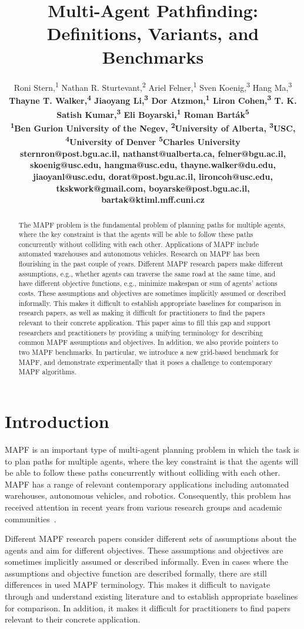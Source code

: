\documentclass[letterpaper]{article} %
\title{Multi-Agent Pathfinding: Definitions, Variants, and Benchmarks}
\author{
Roni Stern,\textsuperscript{\rm 1}
Nathan R. Sturtevant,\textsuperscript{\rm 2}
Ariel Felner,\textsuperscript{\rm 1}
Sven Koenig,\textsuperscript{\rm 3}
Hang Ma,\textsuperscript{\rm 3}\\
\bf \Large Thayne T. Walker,\textsuperscript{\rm 4}
Jiaoyang Li,\textsuperscript{\rm 3}
Dor Atzmon,\textsuperscript{\rm 1}
Liron Cohen,\textsuperscript{\rm 3}
T. K. Satish Kumar,\textsuperscript{\rm 3}
Eli Boyarski,\textsuperscript{\rm 1}
Roman Bart\'{a}k\textsuperscript{\rm 5} \\
\textsuperscript{\rm 1}Ben Gurion University of the Negev,
\textsuperscript{\rm 2}University of Alberta,
\textsuperscript{\rm 3}USC,
\textsuperscript{\rm 4}University of Denver
\textsuperscript{\rm 5}Charles University\\
sternron@post.bgu.ac.il,
nathanst@ualberta.ca,
felner@bgu.ac.il,
skoenig@usc.edu,
hangma@usc.edu,
thayne.walker@du.edu,\\
jiaoyanl@usc.edu,
dorat@post.bgu.ac.il,
lironcoh@usc.edu,
tkskwork@gmail.com,
boyarske@post.bgu.ac.il,
bartak@ktiml.mff.cuni.cz
}
\newcommand{\mapf}{\ac{MAPF}\xspace}
\begin{document}
\maketitle

\begin{abstract}	The \mapf problem is the fundamental problem of planning paths for multiple agents, where the key constraint is that the agents will be able to follow these paths concurrently without colliding with each other. Applications of \mapf include automated warehouses and autonomous vehicles. Research on \mapf has been flourishing in the past couple of years. 
	Different \mapf research papers make different assumptions, e.g., whether agents can traverse the same road at the same time, and have different objective functions, e.g., minimize makespan or sum of agents' actions costs. 
	These assumptions and objectives are sometimes implicitly assumed or described informally. This makes it difficult to establish appropriate baselines for comparison in research papers, as well as making it difficult for practitioners to find the papers relevant to their concrete application. 
	This paper aims to fill this gap and support researchers and practitioners by providing a unifying terminology for describing common \mapf assumptions and objectives. In addition, we also provide pointers to two \mapf benchmarks. In particular, we introduce a new grid-based benchmark for \mapf, and demonstrate experimentally that it poses a challenge to contemporary \mapf algorithms. 
\end{abstract}


\section{Introduction}

\mapf is an important type of multi-agent planning problem in which the task is to plan paths for multiple agents, 
where the key constraint is that the agents will be able to follow these paths concurrently without colliding with each other. \mapf has a range of relevant contemporary applications including automated warehouses, autonomous vehicles, and robotics. Consequently, this problem has received attention in recent years from various research groups and academic communities~\cite{standley2010finding,felner2017search,surynek2016empirical,bartak2018aScheduling,cohen2018anytime,li2019multi,MaAAAI19a}.

Different \mapf research papers consider different sets of assumptions about the agents and aim for different objectives. These assumptions and objectives are sometimes implicitly assumed or described informally. Even in cases where the assumptions and objective function are described formally, there are still differences in used \mapf terminology. This makes it difficult to navigate through and understand existing literature and to establish appropriate baselines for comparison. In addition, it makes it difficult for practitioners to find papers relevant to their concrete application. 
\end{document}
